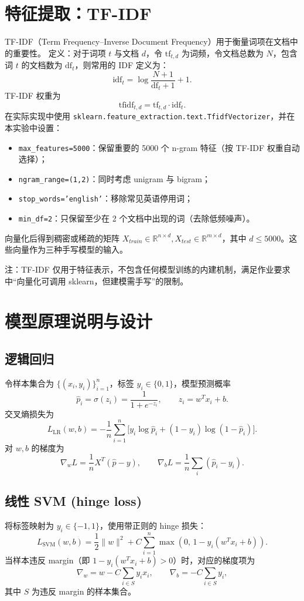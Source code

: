\section{特征提取：TF-IDF}
TF-IDF（Term Frequency–Inverse Document Frequency）用于衡量词项在文档中的重要性。
定义：对于词项 $t$ 与文档 $d$，令 $\mathrm{tf}_{t,d}$ 为词频，令文档总数为 $N$，包含词 $t$ 的文档数为 $\mathrm{df}_t$，则常用的 IDF 定义为：
$$\mathrm{idf}_t=\log\frac{N+1}{\mathrm{df}_t+1}+1.$$ 
TF-IDF 权重为
$$\mathrm{tfidf}_{t,d}=\mathrm{tf}_{t,d}\cdot\mathrm{idf}_t.$$ 
在实际实现中使用 \texttt{sklearn.feature\_extraction.text.TfidfVectorizer}，并在本实验中设置：
\begin{itemize}
    \item \texttt{max\_features=5000}：保留重要的 5000 个 n-gram 特征（按 TF-IDF 权重自动选择）；
    \item \texttt{ngram\_range=(1,2)}：同时考虑 unigram 与 bigram；
    \item \texttt{stop\_words='english'}：移除常见英语停用词；
    \item \texttt{min\_df=2}：只保留至少在 2 个文档中出现的词（去除低频噪声）。
\end{itemize}
向量化后得到稠密或稀疏的矩阵 $X_{train}\in\mathbb{R}^{n\times d},X_{test}\in\mathbb{R}^{m\times d}$，其中 $d\le5000$。这些向量作为三种手写模型的输入。

注：TF-IDF 仅用于特征表示，不包含任何模型训练的内建机制，满足作业要求中“向量化可调用 sklearn，但建模需手写”的限制。

\section{模型原理说明与设计}

\subsection{逻辑回归}
令样本集合为 $\{(x_i,y_i)\}_{i=1}^n$，标签 $y_i\in\{0,1\}$，模型预测概率
$$\hat p_i=\sigma(z_i)=\frac{1}{1+e^{-z_i}},\qquad z_i=w^T x_i + b.$$ 
交叉熵损失为
$$L_{\text{LR}}(w,b)= -\frac{1}{n}\sum_{i=1}^n \big[y_i\log\hat p_i + (1-y_i)\log(1-\hat p_i)\big].$$
对 $w,b$ 的梯度为
$$\nabla_w L = \frac{1}{n} X^T(\hat p - y),\qquad \nabla_b L=\frac{1}{n}\sum_i(\hat p_i-y_i).$$

\subsection{线性 SVM (hinge loss)}
将标签映射为 $y_i\in\{-1,1\}$，使用带正则的 hinge 损失：
$$L_{\text{SVM}}(w,b)=\frac{1}{2}\|w\|^2 + C\sum_{i=1}^n\max(0,\,1-y_i(w^T x_i+b)).$$
当样本违反 margin（即 $1-y_i(w^T x_i+b)>0$）时，对应的梯度项为
$$\nabla_w = w - C\sum_{i\in S} y_i x_i,\qquad \nabla_b = -C\sum_{i\in S} y_i,$$
其中 $S$ 为违反 margin 的样本集合。

